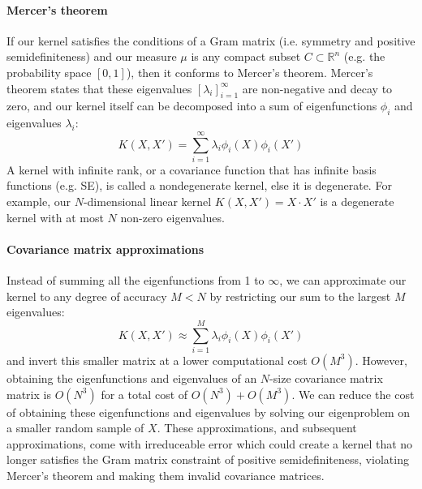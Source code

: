 \paragraph{Mercer's theorem}
If our kernel satisfies the conditions of a Gram matrix (i.e. symmetry and positive semidefiniteness) and our measure $\mu$ is any compact subset $C \subset \mathbb{R}^n$ (e.g. the probability space $[0,1]$), then it conforms to Mercer's theorem. Mercer's theorem states that these eigenvalues $[\lambda_i]_{i=1}^\infty$ are non-negative and decay to zero, and our kernel itself can be decomposed into a sum of eigenfunctions $\phi_i$ and eigenvalues $\lambda_i$:
\begin{equation} \label{eq:gp_mercer}
    K(X, X') = \sum_{i=1}^{\infty} \lambda_i \phi_i(X) \phi_i(X')
\end{equation}
A kernel with infinite rank, or a covariance function that has infinite basis functions (e.g. SE), is called a nondegenerate kernel, else it is degenerate. For example, our $N$-dimensional linear kernel $K(X, X') = X \cdot X'$ is a degenerate kernel with at most $N$ non-zero eigenvalues.

\paragraph{Covariance matrix approximations}
Instead of summing all the eigenfunctions from 1 to $\infty$, we can approximate our kernel to any degree of accuracy $M < N$ by restricting our sum to the largest $M$ eigenvalues:
\begin{equation} \label{eq:gp_mercer_approx}
    K(X, X') \approx \sum_{i=1}^{M} \lambda_i \phi_i(X) \phi_i(X')
\end{equation}
and invert this smaller matrix at a lower computational cost $O(M^3)$. However, obtaining the eigenfunctions and eigenvalues of an $N$-size covariance matrix matrix is $O(N^3)$ for a total cost of $O(N^3) + O(M^3)$. We can reduce the cost of obtaining these eigenfunctions and eigenvalues by solving our eigenproblem on a smaller random sample of $X$. These approximations, and subsequent approximations, come with irreduceable error which could create a kernel that no longer satisfies the Gram matrix constraint of positive semidefiniteness, violating Mercer's theorem and making them invalid covariance matrices. 

